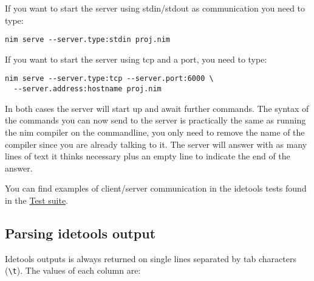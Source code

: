If you want to start the server using stdin/stdout as communication you
need to type:

\begin{verbatim}
nim serve --server.type:stdin proj.nim
\end{verbatim}

If you want to start the server using tcp and a port, you need to type:

\begin{verbatim}
nim serve --server.type:tcp --server.port:6000 \
  --server.address:hostname proj.nim
\end{verbatim}

In both cases the server will start up and await further commands. The
syntax of the commands you can now send to the server is practically the
same as running the nim compiler on the commandline, you only need to
remove the name of the compiler since you are already talking to it. The
server will answer with as many lines of text it thinks necessary plus
an empty line to indicate the end of the answer.

You can find examples of client/server communication in the idetools
tests found in the \protect\hyperlink{test-suite}{Test suite}.

\hypertarget{parsing-idetools-output}{%
\subsection{Parsing idetools output}\label{parsing-idetools-output}}

Idetools outputs is always returned on single lines separated by tab
characters (\texttt{\textbackslash{}t}). The values of each column are:

